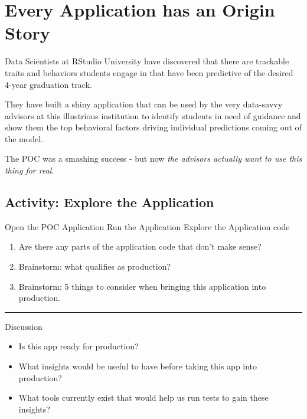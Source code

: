 \documentclass[]{book}
\providecommand{\tightlist}{%
  \setlength{\itemsep}{0pt}\setlength{\parskip}{0pt}}
\begin{document}
\hypertarget{every-application-has-an-origin-story}{%
\section{Every Application has an Origin
Story}\label{every-application-has-an-origin-story}}

Data Scientists at RStudio University have discovered that there are
trackable traits and behaviors students engage in that have been
predictive of the desired 4-year graduation track.

They have built a shiny application that can be used by the very
data-savvy advisors at this illustrious institution to identify students
in need of guidance and show them the top behavioral factors driving
individual predictions coming out of the model.

The POC was a smashing success - but now \emph{the advisors actually
want to use this thing for real}.

\hypertarget{activity-explore-the-application}{%
\subsection{Activity: Explore the
Application}\label{activity-explore-the-application}}

Open the POC Application Run the Application Explore the Application
code

\begin{enumerate}
\def\labelenumi{\arabic{enumi}.}
\tightlist
\item
  Are there any parts of the application code that don't make sense?
\item
  Brainstorm: what qualifies as production?
\item
  Brainstorm: 5 things to consider when bringing this application into
  production.
\end{enumerate}

\begin{center}\rule{0.5\linewidth}{\linethickness}\end{center}

Discussion

\begin{itemize}
\tightlist
\item
  Is this app ready for production?
\item
  What insights would be useful to have before taking this app into
  production?
\item
  What tools currently exist that would help us run tests to gain these
  insights?
\end{itemize}
\end{document}
